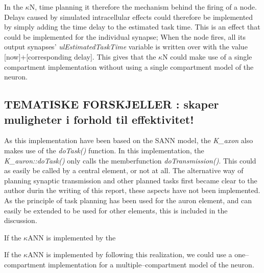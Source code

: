 		In the $\kappa$N, time planning it therefore the mechanism behind the firing of a node.
		Delays caused by simulated intracellular effects could therefore be implemented by simply adding the time delay to the estimated task time.
		This is an effect that could be implemented for the individual synapse;
			When the node fires, all its output synapses' \emph{ulEstimatedTaskTime} variable is written over with the value [now]+[corresponding delay].
		This gives that the $\kappa$N could make use of a single compartment implementation without using a single compartment model of the neuron.

\subsection{TEMATISKE FORSKJELLER : skaper muligheter i forhold til effektivitet!}
		As this implementation have been based on the SANN model, the \emph{K\_axon} also makes use of the \emph{doTask()} function.
		In this implementation, the \emph{K\_auron::doTask()} only calls the memberfunction \emph{doTransmission()}. This could as easily be called by a central element, or not at all. %
		The alternative way of planning synaptic transmission and other planned tasks first became clear to the author durin the writing of this report, these aspects have not been implemented.
		As the principle of task planning has been used for the auron element, and can easily be extended to be used for other elements, this is included in the discussion.


		If the $\kappa$ANN is implemented by the 

		If the $\kappa$ANN is implemented by following this realization, we could use a one--compartment implementation for a multiple--compartment model of the neuron.

